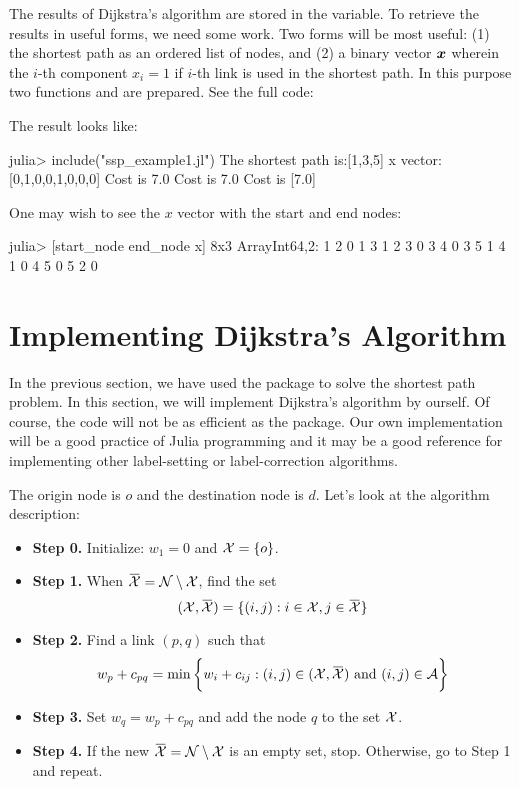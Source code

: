 The results of Dijkstra's algorithm are stored in the  variable. To retrieve the results in useful forms, we need some work. Two forms will be most useful: (1) the shortest path as an ordered list of nodes, and (2) a binary vector $\boldsymbol{x}$ wherein the $i$-th component $x_i=1$ if $i$-th link is used in the shortest path. In this purpose two functions  and  are prepared. See the full code:
\begin{codelisting}
\end{codelisting}




The result looks like:
\begin{code}
julia> include("ssp_example1.jl")
The shortest path is:[1,3,5]
x vector:[0,1,0,0,1,0,0,0]
Cost is 7.0
Cost is 7.0
Cost is [7.0]
\end{code}

One may wish to see the $x$ vector with the start and end nodes:
\begin{code}
julia> [start_node end_node x]
8x3 Array{Int64,2}:
 1  2  0
 1  3  1
 2  3  0
 3  4  0
 3  5  1
 4  1  0
 4  5  0
 5  2  0
\end{code}



\section{Implementing Dijkstra's Algorithm}

In the previous section, we have used the  package to solve the shortest path problem. In this section, we will implement Dijkstra's algorithm by ourself. Of course, the code will not be as efficient as the  package. Our own implementation will be a good practice of Julia programming and it may be a good reference for implementing other label-setting or label-correction algorithms.

The origin node is $o$ and the destination node is $d$. Let's look at the algorithm description:
\begin{itemize}
\item \textbf{Step 0.} Initialize: $w_1=0$ and $\mathcal{X}=\{o\}$.
\item \textbf{Step 1.} When $\bar{\Xc} = \Nc \setminus \Xc$, find the set
\[
	(\Xc,\bar{\Xc}) = \{ (i,j) : i\in\Xc, j\in\bar{\Xc} \}
\]
\item \textbf{Step 2.} Find a link $(p,q)$ such that
\[
	w_p + c_{pq} = \min \bigg\{ w_i + c_{ij} : (i,j)\in(\Xc,\bar{\Xc}) \text{ and } (i,j)\in\Ac \bigg\}
\]
\item \textbf{Step 3.} Set $w_q = w_p + c_{pq}$ and add the node $q$ to the set $\mathcal{X}$.
\item \textbf{Step 4.} If the new $\bar{\Xc} = \Nc \setminus \Xc$ is an empty set, stop. Otherwise, go to Step 1 and repeat.
\end{itemize}

